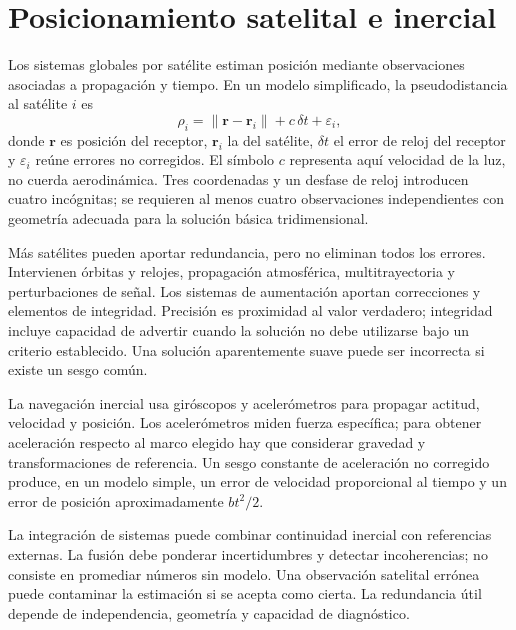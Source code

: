\section{Posicionamiento satelital e inercial}
Los sistemas globales por satélite estiman posición mediante observaciones asociadas a propagación y tiempo. En un modelo simplificado, la pseudodistancia al satélite $i$ es
\begin{equation}\label{eq:14-gnss}
\rho_i=\|\boldsymbol r-\boldsymbol r_i\|+c\,\delta t+\varepsilon_i,
\end{equation}
donde $\boldsymbol r$ es posición del receptor, $\boldsymbol r_i$ la del satélite, $\delta t$ el error de reloj del receptor y $\varepsilon_i$ reúne errores no corregidos. El símbolo $c$ representa aquí velocidad de la luz, no cuerda aerodinámica. Tres coordenadas y un desfase de reloj introducen cuatro incógnitas; se requieren al menos cuatro observaciones independientes con geometría adecuada para la solución básica tridimensional.

Más satélites pueden aportar redundancia, pero no eliminan todos los errores. Intervienen órbitas y relojes, propagación atmosférica, multitrayectoria y perturbaciones de señal. Los sistemas de aumentación aportan correcciones y elementos de integridad. Precisión es proximidad al valor verdadero; integridad incluye capacidad de advertir cuando la solución no debe utilizarse bajo un criterio establecido. Una solución aparentemente suave puede ser incorrecta si existe un sesgo común.

La navegación inercial usa giróscopos y acelerómetros para propagar actitud, velocidad y posición. Los acelerómetros miden fuerza específica; para obtener aceleración respecto al marco elegido hay que considerar gravedad y transformaciones de referencia. Un sesgo constante de aceleración no corregido produce, en un modelo simple, un error de velocidad proporcional al tiempo y un error de posición aproximadamente $bt^2/2$.

La integración de sistemas puede combinar continuidad inercial con referencias externas. La fusión debe ponderar incertidumbres y detectar incoherencias; no consiste en promediar números sin modelo. Una observación satelital errónea puede contaminar la estimación si se acepta como cierta. La redundancia útil depende de independencia, geometría y capacidad de diagnóstico.

